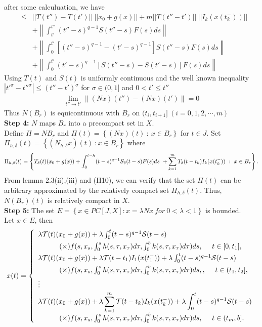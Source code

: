 \documentclass[11pt]{article}
\def \mc{\mathcal}
\begin{document}
after some calculuation, we have 
\begin{eqnarray*}
&\leq&||T(t'')-T(t')|| \ ||x_0+g(x)||+m||T(t''-t')|| \ ||I_k(x(t_k^-))||\\
& &+\left\|\int^{t''}_{t'}(t''-s)^{q-1}S(t''-s)F(s)ds\right\|\\
& &+\left\|\int^{t'}_0\left[(t''-s)^{q-1}-(t'-s)^{q-1}\right]S(t''-s)F(s)ds\right\|\\
& & +\left\|\int^{t'}_0(t'-s)^{q-1}\left[S(t''-s)-S(t'-s)\right]F(s)ds\right\|
\end{eqnarray*}
Using $T(t)$ and $S(t)$ is uniformly continuous and the well known inequality $|t'^\sigma-t''^\sigma|\leq (t''-t')^\sigma$ for $\sigma \in (0,1]$ and $0<t'\leq t''$
\begin{eqnarray*}
\displaystyle \lim_{t'' \rightarrow t'}\left\|(Nx)(t'')-(Nx)(t')\right\|=0
\end{eqnarray*}
Thus $N(B_r)$ is equicontinuous with $B_r$ on $(t_i,t_{i+1}] \ (i=0,1,2,\cdots,m)$\\
{\bf Step 4:} $N$ maps $B_r$ into a precompact set in $X$.\\
Define $\Pi=NB_r$ and $\Pi(t)=\left\{(Nx)(t) \ : \ x\in B_r\right\}$ for $t\in J$.
Set $\Pi_{h,\delta}(t)=\left\{(N_{h,\delta}x)(t) \ :x\in B_r\right\}$
where
$$
\Pi_{h,\delta}(t)=\left\{T_\delta(t)(x_0+g(x))+ \int^{t-h}_0(t-s)^{q-1}S_\delta (t-s)F(s)ds \right. \\ \left. +\displaystyle \sum_{k=1}^m T_\delta(t-t_k)I_k(x(t_k^-)) \ : \ x\in B_r\right\}.
$$
From lemma 2.3(ii),(iii) and (H10),  we can verify that the set $\Pi(t)$ can be arbitrary approximated by the relatively compact set $\Pi_{h,\delta}(t)$. Thus, $N(B_r)(t)$ is relatively compact in $X$.\\
{\bf Step 5:} The set $E=\left\{x\in PC[J,X] : x=\lambda Nx \ for \ 0<\lambda <1\right\}$ is bounded.\\
Let $x\in E$, then
\begin{eqnarray}
x(t)=\left\{\begin{array}{ll}\lambda\mc{T}(t)(x_0+g(x)) +\lambda\int^t_0(t-s)^{q-1}\mc{S} (t-s)  \\ [3pt] \indent \indent (\times)f(s,x_s,\int^s_0h(s,\tau,x_\tau)d\tau,\int^b_0k(s,\tau,x_\tau)d\tau)ds, \ \ \ \ t\in [0,t_1], \\ [3pt]
\lambda\mc{T}(t)(x_0+g(x))+\lambda\mc{T}(t-t_1)I_1(x(t_1^-))+\lambda\int^t_0(t-s)^{q-1}\mc{S}(t-s)\\ [3pt] \indent \indent (\times)f(s,x_s,\int^s_0h(s,\tau,x_\tau)d\tau,\int^b_0k(s,\tau,x_\tau)d\tau)ds,, \ \ \ \ t\in(t_1,t_2], \\ [3pt]
\vdots \\ [3pt]
\lambda\mc{T}(t)(x_0+g(x))+\lambda\displaystyle \sum_{k=1}^{m} \mc{T}(t-t_k)I_k(x(t_k^-))+\lambda\int^t_0(t-s)^{q-1}\mc{S}(t-s)\\ [3pt] \indent \indent (\times)f(s,x_s,\int^s_0h(s,\tau,x_\tau)d\tau,\int^b_0k(s,\tau,x_\tau)d\tau)ds, \ \ \ \ t\in(t_m,b].
\end{array}
\right.
\end{eqnarray} 
\end{document}
